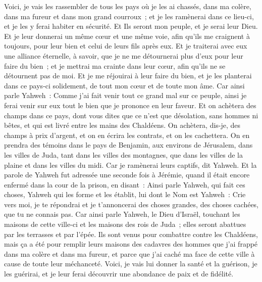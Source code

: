 \begin{multicols}{2}
Voici, je vais les rassembler de tous les pays où je les ai chassés, dans ma colère, dans ma fureur et dans mon grand courroux~; et je les ramènerai dans ce lieu-ci, et je les y ferai habiter en sécurité.
Et Ils seront mon peuple, et je serai leur Dieu.
Et je leur donnerai un même cœur et une même voie, afin qu'ils me craignent à toujours, pour leur bien et celui de leurs fils après eux.
Et je traiterai avec eux une alliance éternelle, à savoir, que je ne me détournerai plus d'eux pour leur faire du bien~; et je mettrai ma crainte dans leur cœur, afin qu'ils ne se détournent pas de moi.
Et je me réjouirai à leur faire du bien, et je les planterai dans ce pays-ci solidement, de tout mon cœur et de toute mon âme.
Car ainsi parle Yahweh~: Comme j'ai fait venir tout ce grand mal sur ce peuple, ainsi je ferai venir sur eux tout le bien que je prononce en leur faveur.
Et on achètera des champs dans ce pays, dont vous dites que ce n'est que désolation, sans hommes ni bêtes, et qui est livré entre les mains des Chaldéens.
On achètera, dis-je, des champs à prix d'argent, et on en écrira les contrats, et on les cachettera. On en prendra des témoins dans le pays de Benjamin, aux environs de Jérusalem, dans les villes de Juda, tant dans les villes des montagnes, que dans les villes de la plaine et dans les villes du midi. Car je ramènerai leurs captifs, dit Yahweh.
\VerseOne{}Et la parole de Yahweh fut adressée une seconde fois à Jérémie, quand il était encore enfermé dans la cour de la prison, en disant~:
Ainsi parle Yahweh, qui fait ces choses, Yahweh qui les forme et les établit, lui dont le Nom est Yahweh~:
Crie vers moi, je te répondrai et je t'annoncerai des choses grandes, des choses cachées, que tu ne connais pas.
Car ainsi parle Yahweh, le Dieu d'Israël, touchant les maisons de cette ville-ci et les maisons des rois de Juda~; elles seront abattues par les terrasses et par l'épée.
Ils sont venus pour combattre contre les Chaldéens, mais ça a été pour remplir leurs maisons des cadavres des hommes que j'ai frappé dans ma colère et dans ma fureur, et parce que j'ai caché ma face de cette ville à cause de toute leur méchanceté.
Voici, je vais lui donner la santé et la guérison, je les guérirai, et je leur ferai découvrir une abondance de paix et de fidélité.

\end{multicols}
